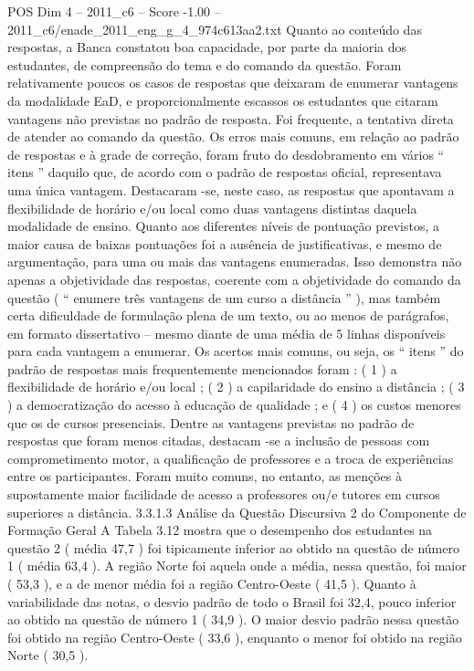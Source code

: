 \begin{textsample}{POS Dim 4 – 2011\_c6 – Score -1.00 – 2011\_c6/enade\_2011\_eng\_g\_4\_974c613aa2.txt}
Quanto ao conteúdo das respostas, a Banca constatou boa capacidade, por parte da maioria dos estudantes, de compreensão do tema e do comando da questão.
Foram relativamente poucos os casos de respostas que deixaram de enumerar vantagens da modalidade EaD, e proporcionalmente escassos os estudantes que citaram vantagens não previstas no padrão de resposta.
Foi frequente, a tentativa direta de atender ao comando da questão.
Os erros mais comuns, em relação ao padrão de respostas e à grade de correção, foram fruto do desdobramento em vários “ itens ” daquilo que, de acordo com o padrão de respostas oficial, representava uma única vantagem.
Destacaram -se, neste caso, as respostas que apontavam a flexibilidade de horário e/ou local como duas vantagens distintas daquela modalidade de ensino.
Quanto aos diferentes níveis de pontuação previstos, a maior causa de baixas pontuações foi a ausência de justificativas, e mesmo de argumentação, para uma ou mais das vantagens enumeradas.
Isso demonstra não apenas a objetividade das respostas, coerente com a objetividade do comando da questão ( “ enumere três vantagens de um curso a distância ” ), mas também certa dificuldade de formulação plena de um texto, ou ao menos de parágrafos, em formato dissertativo – mesmo diante de uma média de 5 linhas disponíveis para cada vantagem a enumerar.
Os acertos mais comuns, ou seja, os “ itens ” do padrão de respostas mais frequentemente mencionados foram : ( 1 ) a flexibilidade de horário e/ou local ; ( 2 ) a capilaridade do ensino a distância ; ( 3 ) a democratização do acesso à educação de qualidade ; e ( 4 ) os custos menores que os de cursos presenciais.
Dentre as vantagens previstas no padrão de respostas que foram menos citadas, destacam -se a inclusão de pessoas com comprometimento motor, a qualificação de professores e a troca de experiências entre os participantes.
Foram muito comuns, no entanto, as menções à supostamente maior facilidade de acesso a professores ou/e tutores em cursos superiores a distância. 3.3.1.3 Análise da Questão Discursiva 2 do Componente de Formação Geral A Tabela 3.12 mostra que o desempenho dos estudantes na questão 2 ( média 47,7 ) foi tipicamente inferior ao obtido na questão de número 1 ( média 63,4 ).
A região Norte foi aquela onde a média, nessa questão, foi maior ( 53,3 ), e a de menor média foi a região Centro-Oeste ( 41,5 ).
Quanto à variabilidade das notas, o desvio padrão de todo o Brasil foi 32,4, pouco inferior ao obtido na questão de número 1 ( 34,9 ).
O maior desvio padrão nessa questão foi obtido na região Centro-Oeste ( 33,6 ), enquanto o menor foi obtido na região Norte ( 30,5 ).

\end{textsample}
